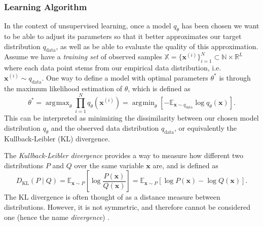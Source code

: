 \documentclass{article}
\DeclareMathOperator*{\argmax}{\arg\!\max}
\DeclareMathOperator*{\argmin}{\arg\!\min}
\begin{document}



\subsubsection{Learning Algorithm} \label{sec:learn}

In the context of unsupervised learning, once a model $q_{\theta}$ has been chosen we want to be able to adjust its parameters so that it better approximates our target distribution $q_{\text{data}}$, as well as be able to evaluate the quality of this approximation. Assume we have a \textit{training set} of observed samples $\mathbb{X} = \{\bm{x}^{(i)}\}_{i=1}^{N} \subset \mathbb{N} \times \mathbb{R}^L$ where each data point stems from our empirical data distribution, i.e. $\bm{x}^{(i)} \sim q_{\text{data}}$. One way to define a model with optimal parameters $\theta^{*}$ is through the maximum likelihood estimation of $\theta$, which is defined as
\begin{equation}
    \theta^{*} = \argmax_{\theta} \prod_{i=1}^N q_{\theta}\left(\bm{x}^{(i)}\right) = \argmin_{\theta} \left[ -\mathbb{E}_{\bm{x} \sim q_{\text{data}}} \log q_{\theta}(\bm{x}) \right].
\end{equation}
This can be interpreted as minimizing the dissimilarity between our chosen model distribution $q_{\theta}$ and the observed data distribution $q_{\text{data}}$, or equivalently the Kullback-Leibler (KL) divergence. 

The \textit{Kullback-Leibler divergence} provides a way to measure how different two distributions $P$ and $Q$ over the same variable $\bm{x}$ are, and is defined as
\begin{equation}
    D_{\text{KL}}(P \mid Q) = \mathbb{E}_{\bm{x}\sim P}\left[ \log \frac{P(\bm{x})}{Q{(\bm{x})}} \right] = \mathbb{E}_{\bm{x}\sim P}\left[ \log P(\bm{x}) - \log Q(\bm{x}) \right].
\end{equation}
The KL divergence is often thought of as a distance measure between distributions. However, it is not symmetric, and therefore cannot be considered one (hence the name \textit{divergence}) \cite{goodfellow2016deep}.
\end{document}
